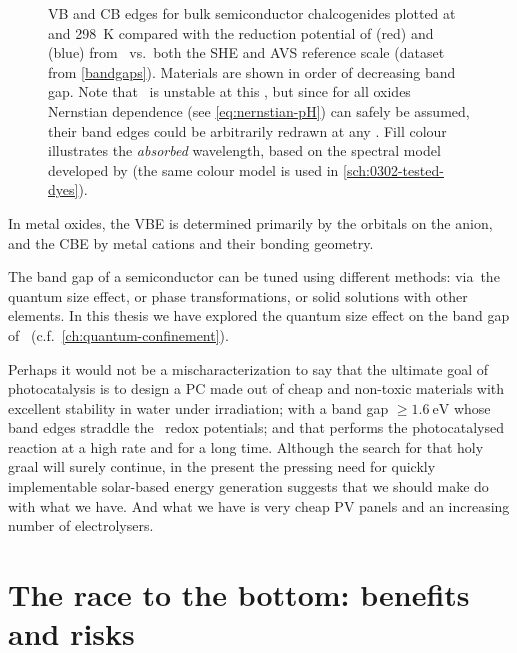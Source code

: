 \documentclass[draft,webedition,openright,titles,swedish,english]{LuaUUThesis}\usepackage[]{graphicx}\usepackage[]{xcolor}
\newcommand{\cf}{c.f.}
\newcommand{\via}{via}
\newcommand{\vs}{vs.}
\begin{document}
\begin{figure}[tbp]
\begin{tikzpicture}[font=\scriptsize\fnstyle, xscale=1.00, yscale=1.00]
\end{tikzpicture}
\caption[Band edges of semiconductor chalcogenides]{%
   \protect\Gls{VB} and \protect\gls{CB} edges for bulk semiconductor chalcogenides
   plotted at  and \qty{298}{\kelvin} compared with the reduction potential
   of \protect{} (red) and
   \protect{} (blue) from \water\ \vs\ both the
   \protect\gls{SHE} and \protect\gls{AVS} reference scale (dataset from \cref{bandgaps}).
   Materials are shown in order of decreasing band gap.
   Note that \ZnO\ is unstable at this \pH, but since for all oxides
   Nernstian dependence (see \cref{eq:nernstian-pH})
   can safely be assumed, their band edges could be arbitrarily redrawn at any \pH.
   Fill colour illustrates the \emph{absorbed} wavelength, based on
   the spectral model developed by \textcite{Aphalo2015}
   (the same colour model is used in \cref{sch:0302-tested-dyes}).}
\label{fig:0100-bandgaps-all}
\end{figure}

\egroup



In metal oxides, the \gls{VBE} is determined primarily by the orbitals on the
\oxide{} anion, and the \gls{CBE} by metal cations and their bonding geometry.

The band gap of a semiconductor can be tuned using different methods:
\via\ the quantum size effect, or phase transformations, or solid solutions
with other elements.
In this thesis we have explored the quantum size effect on the band gap of \ZnO\
(\cf\ \cref{ch:quantum-confinement}).

Perhaps it would not be a mischaracterization to say that
the ultimate goal of photocatalysis is to design a \gls{PC} made out of
cheap and non-toxic materials with excellent stability in water under irradiation;
with a band gap $\geq\qty{1.6}{\eV}$ whose band edges straddle the \water\ redox
potentials;
and that performs the photocatalysed reaction at a high rate and for a long time.
Although the search for that holy graal will surely continue,
in the present the pressing need for quickly implementable solar-based
energy generation suggests that we should make do with what we have.
And what we have is very cheap \gls{PV} panels and an increasing
number of electrolysers.






\section{The race to the bottom: benefits and risks}
\label{intro:nanoparticles-history-risks}
\end{document}
